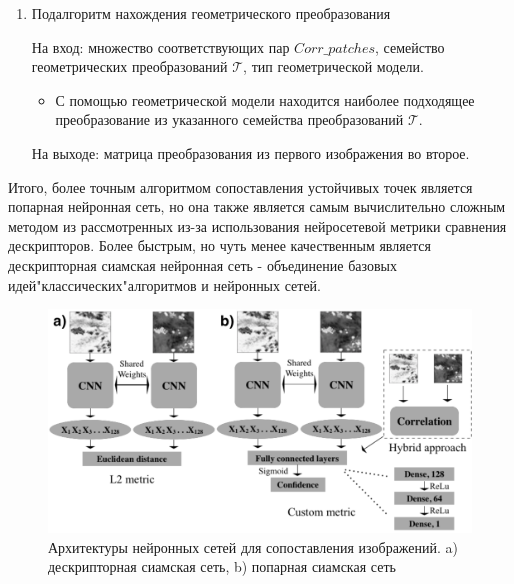 \documentclass[a4paper,12pt]{article}
\begin{document}
\begin{enumerate}
    \item Подалгоритм нахождения геометрического преобразования
    
    На вход: множество соответствующих пар $Corr\_patches$, семейство геометрических преобразований $\mathcal{T}$, тип геометрической модели.
        \begin{itemize}
            \item С помощью геометрической модели находится наиболее подходящее преобразование из указанного семейства преобразований $\mathcal{T}$.
        \end{itemize}
    На выходе: матрица преобразования из первого изображения во второе.
    
\end{enumerate}

Итого, более точным алгоритмом сопоставления устойчивых точек является попарная нейронная сеть, но она также является самым вычислительно сложным методом из рассмотренных из-за использования нейросетевой метрики сравнения дескрипторов. Более быстрым, но чуть менее качественным является дескрипторная сиамская нейронная сеть - объединение базовых идей"классических"алгоритмов и нейронных сетей.

\begin{figure}[!h]
     \centering
     \includegraphics[width=130mm]{models.png}
     \caption{Архитектуры нейронных сетей для сопоставления изображений. a) дескрипторная сиамская сеть, b) попарная сиамская сеть}
     \label{graph}
\end{figure}
\end{document}

